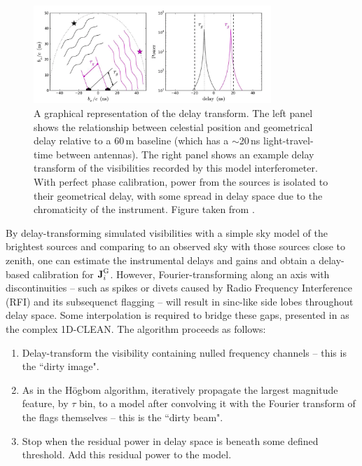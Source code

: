 \begin{figure}
\centering
\includegraphics[width=0.8\textwidth]{chapters/interferometry/figures/delay_space_Parsons12b.png}
\caption[A graphical representation of the delay transform.]{A graphical representation of the delay transform. The left panel shows the relationship between celestial position and geometrical delay relative to a 60\,m baseline (which has a $\sim$20\,ns light-travel-time between antennas). The right panel shows an example delay transform of the visibilities recorded by this model interferometer. With perfect phase calibration, power from the sources is isolated to their geometrical delay, with some spread in delay space due to the chromaticity of the instrument. Figure taken from \cite{Parsons.12a}.} 
\label{fig:delay_space_parsons12b}
\end{figure}

By delay-transforming simulated visibilities with a simple sky model of the brightest sources and comparing to an observed sky with those sources close to zenith, one can estimate the instrumental delays and gains and obtain a delay-based calibration for $\textbf{J}_i^{\rm G}$. However, Fourier-transforming along an axis with discontinuities -- such as spikes or divets caused by Radio Frequency Interference (RFI) and its subsequenct flagging -- will result in sinc-like side lobes throughout delay space. Some interpolation is required to bridge these gaps, presented in \cite{ParsonsBacker.09} as the complex 1D-CLEAN. The algorithm proceeds as follows:

\begin{enumerate}
\item Delay-transform the visibility containing nulled frequency channels -- this is the ``dirty image".
\item As in the H{\"o}gbom algorithm, iteratively propagate the largest magnitude feature, by $\tau$ bin, to a model after convolving it with the Fourier transform of the flags themselves -- this is the ``dirty beam".
\item Stop when the residual power in delay space is beneath some defined threshold. Add this residual power to the model.
\end{enumerate}

